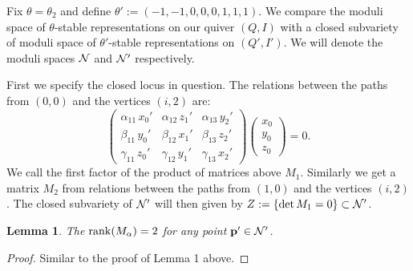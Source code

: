 \documentclass{amsart}
\newtheorem{lem}[thm]{Lemma}
\theoremstyle{definition}
\begin{document}
Fix $\theta= \theta_2$ and define $\theta':= (-1,-1,0,0,0,1,1,1)$. 
We compare the moduli space of $\theta$-stable representations on our quiver $(Q,I)$ with a closed subvariety of moduli space of $\theta'$-stable representations on $(Q',I')$.
We will denote the moduli spaces $\mathcal{N}$ and $\mathcal{N}'$ respectively.

First we specify the closed locus in question.
The relations between the paths from $(0,0)$ and the vertices $(i,2)$ are:
\begin{equation}
    \begin{pmatrix}
    \alpha_{11}\, x_0' & \alpha_{12}\, z_1' & \alpha_{13}\, y_2' \\
    \beta_{11}\, y_0' & \beta_{12}\, x_1' & \beta_{13}\, z_2' \\
    \gamma_{11}\, z_0' & \gamma_{12}\, y_1' & \gamma_{13}\, x_2'
\end{pmatrix} \begin{pmatrix}
    x_0 \\ y_0 \\ z_0
\end{pmatrix} =0.
\end{equation}
We call the first factor of the product of matrices above $M_1$.
Similarly we get a matrix $M_2$ from relations between the paths from $(1,0)$ and the vertices $(i,2)$.
The closed subvariety of $\mathcal{N}'$ will then given by $Z:= \{\operatorname{det} M_1=0\} \subset \mathcal{N}'$.


\begin{lem}\label{lm:rank}
The $\operatorname{rank}(M_\alpha) = 2$ for any point $\mathbf{p}' \in \mathcal{N}'$.
\end{lem}

\begin{proof}
Similar to the proof of Lemma 1 above.
%
%
\end{proof}
\end{document}
